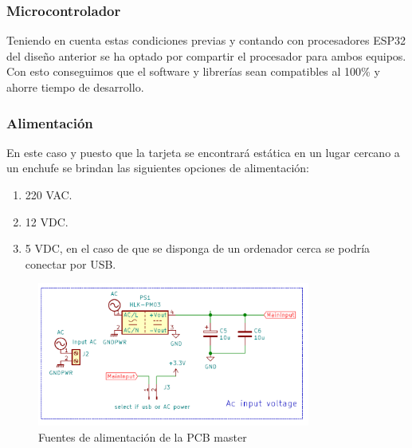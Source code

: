 \documentclass[a4paper ,12pt, onecolumn]{article}
\begin{document}
        \subsubsection{Microcontrolador} 
            Teniendo en cuenta estas condiciones previas y contando con procesadores ESP32 del diseño anterior se ha optado por compartir 
            el procesador para ambos equipos. Con esto conseguimos que el software y librerías sean compatibles al 100\% y ahorre tiempo
            de desarrollo.
        \subsubsection{Alimentación} 
            En este caso y puesto que la tarjeta se encontrará estática en un lugar cercano a un enchufe se brindan las siguientes opciones
            de alimentación:
            \begin{enumerate}
                \item 220 VAC.
                \item 12 VDC.
                \item 5 VDC, en el caso de que se disponga de un ordenador cerca se podría conectar por USB.
            \end{enumerate}
            \begin{center}
                \begin{figure}[h]
                    \centering
                    \includegraphics[width=0.8\textwidth]{../receiver_main_power.PNG}
                    \caption{Fuentes de alimentación de la PCB master}
                    \label{fig:mesh4}
                \end{figure}    
            \end{center}    
\end{document}
